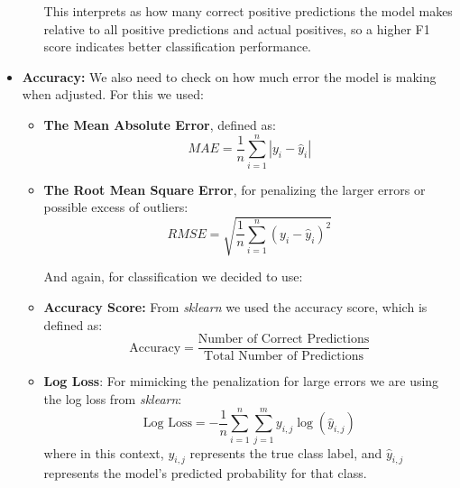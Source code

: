 \documentclass[11pt,english,a4paper,hidelinks]{book}
\begin{document}
\begin{itemize}
\begin{itemize}
        \vspace{0.05cm} This interprets as how many correct positive predictions the model makes relative to all positive predictions and actual positives, so a higher F1 score indicates better classification performance.
    \end{itemize}
    \item \textbf{Accuracy:} We also need to check on how much error the model is making when adjusted. For this we used:
    \begin{itemize}
        \item \textbf{The Mean Absolute Error}, defined as:
        \begin{equation}
            MAE = \frac{1}{n} \sum_{i=1}^{n} |y_i - \hat{y}_i|
        \end{equation}
        \item \textbf{The Root Mean Square Error}, for penalizing the larger errors or possible excess of outliers:
        \begin{equation}
            RMSE = \sqrt{\frac{1}{n} \sum_{i=1}^{n} {(y_i - \hat{y}_i)}^2}
        \end{equation}

        And again, for classification we decided to use:
        \item \textbf{Accuracy Score:} From \textit{sklearn} we used the accuracy score, which is defined as:
        \begin{equation}
            \text{Accuracy} = \frac{\text{Number of Correct Predictions}}{\text{Total Number of Predictions}}
        \end{equation}
        \item \textbf{Log Loss}: For mimicking the penalization for large errors we are using the log loss from \textit{sklearn}:
       \begin{equation} 
        \text{Log Loss} = -\frac{1}{n} \sum_{i=1}^{n} \sum_{j=1}^{m} y_{i,j} \log(\hat{y}_{i,j})
       \end{equation}
       where in this context, \(y_{i,j}\) represents the true class label, and \(\hat{y}_{i,j}\) represents the model's predicted probability for that class.
       
    \end{itemize}
\end{itemize}
\end{document}
